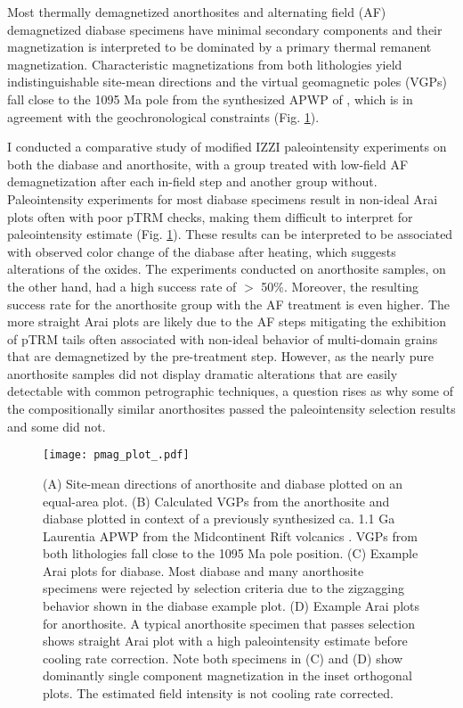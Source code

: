 \documentclass[draft]{agujournal2019}
\begin{document}
  Most thermally demagnetized anorthosites and alternating field (AF) demagnetized diabase specimens have minimal secondary components and their magnetization is interpreted to be dominated by a primary thermal remanent magnetization. Characteristic magnetizations from both lithologies yield indistinguishable site-mean directions and the virtual geomagnetic poles (VGPs) fall close to the 1095 Ma pole from the synthesized APWP of \cite{Swanson-Hysell2019a}, which is in agreement with the geochronological constraints  (Fig. \ref{fig:pmag}). 

I conducted a comparative study of modified IZZI paleointensity experiments on both the diabase and anorthosite, with a group treated with low-field AF demagnetization after each in-field step and another group without. Paleointensity experiments for most diabase specimens result in non-ideal Arai plots often with poor pTRM checks, making them difficult to interpret for paleointensity estimate (Fig. \ref{fig:pmag}). These results can be interpreted to be associated with observed color change of the diabase after heating, which suggests alterations of the oxides. The experiments conducted on anorthosite samples, on the other hand, had a high success rate of $>$ 50\%. Moreover, the resulting success rate for the anorthosite group with the AF treatment is even higher. The more straight Arai plots are likely due to the AF steps mitigating the exhibition of pTRM tails often associated with non-ideal behavior of multi-domain grains that are demagnetized by the pre-treatment step. However, as the nearly pure anorthosite samples did not display dramatic alterations that are easily detectable with common petrographic techniques, a question rises as why some of the compositionally similar anorthosites passed the paleointensity selection results and some did not. 

\begin{figure}
\noindent\texttt{[image: pmag\_plot\_.pdf]}
\caption{\small{(A) Site-mean directions of anorthosite and diabase plotted on an equal-area plot. (B) Calculated VGPs from the anorthosite and diabase plotted in context of a previously synthesized ca. 1.1 Ga Laurentia APWP from the Midcontinent Rift volcanics \citep{Swanson-Hysell2019a}. VGPs from both lithologies fall close to the 1095 Ma pole position. (C) Example Arai plots for diabase. Most diabase and many anorthosite specimens were rejected by selection criteria due to the zigzagging behavior shown in the diabase example plot. (D) Example Arai plots for anorthosite. A typical anorthosite specimen that passes selection shows straight Arai plot with a high paleointensity estimate before cooling rate correction. Note both specimens in (C) and (D) show dominantly single component magnetization in the inset orthogonal plots. The estimated field intensity is not cooling rate corrected.}}
\label{fig:pmag}
\end{figure}
\end{document}
